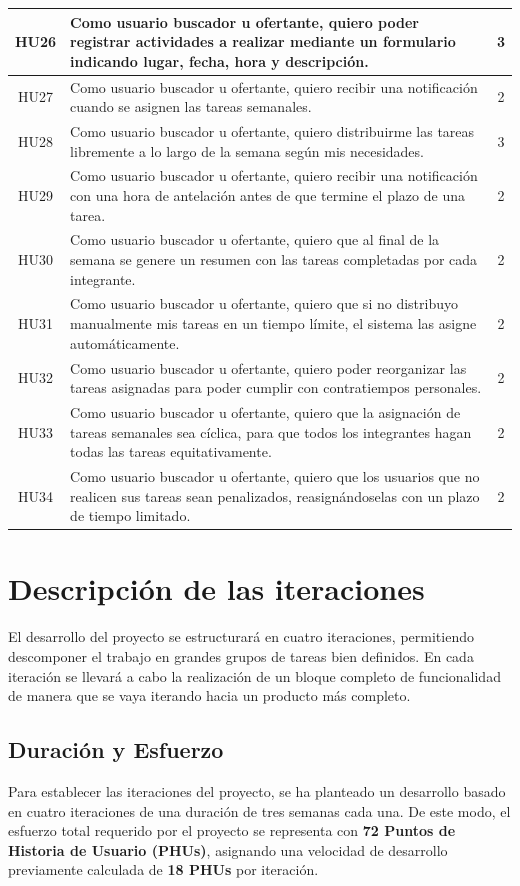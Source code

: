 \begin{longtable}{|c|p{12cm}|c|}
    \hline
    HU26 & Como usuario buscador u ofertante, quiero poder registrar actividades a realizar mediante un formulario indicando lugar, fecha, hora y descripción. & 3 \\
    \hline
    HU27 & Como usuario buscador u ofertante, quiero recibir una notificación cuando se asignen las tareas semanales. & 2 \\
    \hline
    HU28 & Como usuario buscador u ofertante, quiero distribuirme las tareas libremente a lo largo de la semana según mis necesidades. & 3 \\
    \hline
    HU29 & Como usuario buscador u ofertante, quiero recibir una notificación con una hora de antelación antes de que termine el plazo de una tarea. & 2 \\
    \hline
    HU30 & Como usuario buscador u ofertante, quiero que al final de la semana se genere un resumen con las tareas completadas por cada integrante. & 2 \\
    \hline
    HU31 & Como usuario buscador u ofertante, quiero que si no distribuyo manualmente mis tareas en un tiempo límite, el sistema las asigne automáticamente. & 2 \\
    \hline
    HU32 & Como usuario buscador u ofertante, quiero poder reorganizar las tareas asignadas para poder cumplir con contratiempos personales. & 2 \\
    \hline
    HU33 & Como usuario buscador u ofertante, quiero que la asignación de tareas semanales sea cíclica, para que todos los integrantes hagan todas las tareas equitativamente. & 2 \\
    \hline
    HU34 & Como usuario buscador u ofertante, quiero que los usuarios que no realicen sus tareas sean penalizados, reasignándoselas con un plazo de tiempo limitado. & 2 \\
    \hline
\end{longtable}

\section{Descripción de las iteraciones}

El desarrollo del proyecto se estructurará en cuatro iteraciones, permitiendo descomponer el trabajo en grandes grupos de tareas bien definidos. En cada iteración se llevará a cabo la realización de un bloque completo de funcionalidad de manera que se vaya iterando hacia un producto más completo.

\subsection{Duración y Esfuerzo}
Para establecer las iteraciones del proyecto, se ha planteado un desarrollo basado en cuatro iteraciones de una duración de tres semanas cada una. De este modo, el esfuerzo total requerido por el proyecto se representa con \textbf{72 Puntos de Historia de Usuario (PHUs)}, asignando una velocidad de desarrollo previamente calculada de \textbf{18 PHUs} por iteración.

